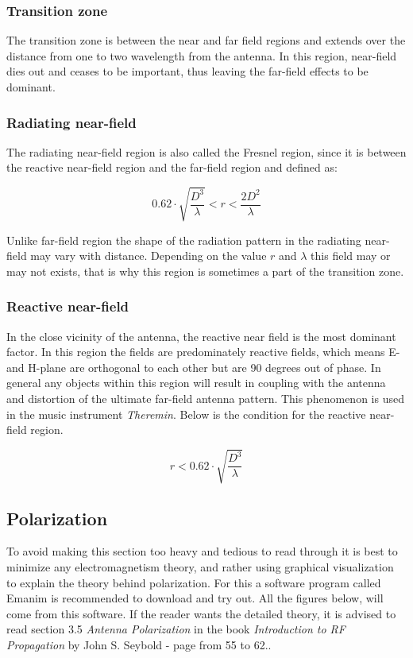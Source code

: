 \subsubsection{Transition zone}
The transition zone is between the near and far field regions and extends over the distance from one to two wavelength from the antenna. In this region, near-field dies out and ceases to be important, thus leaving the far-field effects to be dominant. 

\subsubsection{Radiating near-field}
The radiating near-field region is also called the Fresnel region, since it is between the reactive near-field region and the far-field region and defined as:

\begin{equation}
    0.62 \cdot \sqrt{\frac{D^3}{\lambda}} < r < \frac{2D^2}{\lambda}
\end{equation}

Unlike far-field region the shape of the radiation pattern in the radiating near-field may vary with distance. Depending on the value $r$ and $\lambda$ this field may or may not exists, that is why this region is sometimes a part of the transition zone.   

\subsubsection{Reactive near-field}
In the close vicinity of the antenna, the reactive near field is the most dominant factor. In this region the fields are predominately reactive fields, which means E- and H-plane are orthogonal to each other but are 90 degrees out of phase. In general any objects within this region will result in coupling with the antenna and distortion of the ultimate far-field antenna pattern. This phenomenon is used in the music instrument \textit{Theremin}\cite{Theremin}. Below is the condition for the reactive near-field region.

\begin{equation}
   r < 0.62 \cdot \sqrt{\frac{D^3}{\lambda}}
\end{equation}

\subsection{Polarization}
To avoid making this section too heavy and tedious to read through it is best to minimize any electromagnetism theory, and rather using graphical visualization to explain the theory behind polarization. For this a software program called Emanim\cite{EMANIM} is recommended to download and try out. All the figures below, will come from this software. If the reader wants the detailed theory, it is advised to read section 3.5 \textit{Antenna Polarization} in the book \textit{Introduction to RF Propagation} by John S. Seybold - page from 55 to 62.\cite{RFpropagation}.

